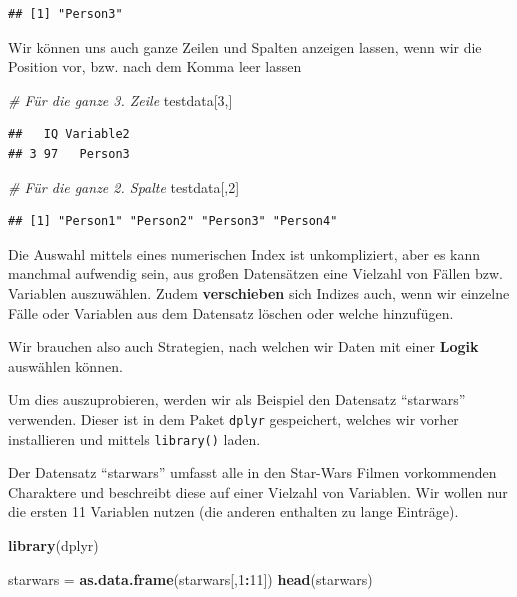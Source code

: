 \documentclass[
]{book}
\newenvironment{Shaded}{\begin{snugshade}}{\end{snugshade}}
\newcommand{\CommentTok}[1]{\textcolor[rgb]{0.56,0.35,0.01}{\textit{#1}}}
\newcommand{\DecValTok}[1]{\textcolor[rgb]{0.00,0.00,0.81}{#1}}
\newcommand{\FunctionTok}[1]{\textcolor[rgb]{0.13,0.29,0.53}{\textbf{#1}}}
\newcommand{\NormalTok}[1]{#1}
\newcommand{\OtherTok}[1]{\textcolor[rgb]{0.56,0.35,0.01}{#1}}
\newcommand{\SpecialCharTok}[1]{\textcolor[rgb]{0.81,0.36,0.00}{\textbf{#1}}}
\begin{document}
\begin{verbatim}
## [1] "Person3"
\end{verbatim}

Wir können uns auch ganze Zeilen und Spalten anzeigen lassen, wenn wir die Position vor, bzw. nach dem Komma leer lassen

\begin{Shaded}
\begin{Highlighting}[]
\CommentTok{\# Für die ganze 3. Zeile}
\NormalTok{testdata[}\DecValTok{3}\NormalTok{,]}
\end{Highlighting}
\end{Shaded}

\begin{verbatim}
##   IQ Variable2
## 3 97   Person3
\end{verbatim}

\begin{Shaded}
\begin{Highlighting}[]
\CommentTok{\# Für die ganze 2. Spalte}
\NormalTok{testdata[,}\DecValTok{2}\NormalTok{]}
\end{Highlighting}
\end{Shaded}

\begin{verbatim}
## [1] "Person1" "Person2" "Person3" "Person4"
\end{verbatim}

Die Auswahl mittels eines numerischen Index ist unkompliziert, aber es kann manchmal aufwendig sein, aus großen Datensätzen eine Vielzahl von Fällen bzw. Variablen auszuwählen.
Zudem \textbf{verschieben} sich Indizes auch, wenn wir einzelne Fälle oder Variablen aus dem Datensatz löschen oder welche hinzufügen.

Wir brauchen also auch Strategien, nach welchen wir Daten mit einer \textbf{Logik} auswählen können.

Um dies auszuprobieren, werden wir als Beispiel den Datensatz ``starwars'' verwenden. Dieser ist in dem Paket \texttt{dplyr} gespeichert, welches wir vorher installieren und mittels \texttt{library()} laden.

Der Datensatz ``starwars'' umfasst alle in den Star-Wars Filmen vorkommenden Charaktere und beschreibt diese auf einer Vielzahl von Variablen.
Wir wollen nur die ersten 11 Variablen nutzen (die anderen enthalten zu lange Einträge).

\begin{Shaded}
\begin{Highlighting}[]
\FunctionTok{library}\NormalTok{(dplyr)}

\NormalTok{starwars }\OtherTok{=} \FunctionTok{as.data.frame}\NormalTok{(starwars[,}\DecValTok{1}\SpecialCharTok{:}\DecValTok{11}\NormalTok{])}
\FunctionTok{head}\NormalTok{(starwars)}
\end{Highlighting}
\end{Shaded}
\end{document}
